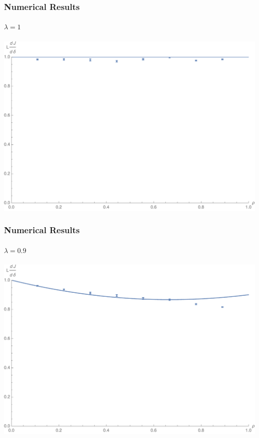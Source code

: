 \documentclass{beamer}
\begin{document}
\begin{frame}
 \frametitle{Numerical Results}
 \framesubtitle{$\lambda = 1$}
 \begin{center}
  \includegraphics[width=0.9\linewidth]{images/lambda1p0}
 \end{center}
\end{frame}

\begin{frame}
 \frametitle{Numerical Results}
 \framesubtitle{$\lambda = 0.9$}
 \begin{center}
  \includegraphics[width=0.9\linewidth]{images/lambda0p9}
 \end{center}
\end{frame}
\end{document}
